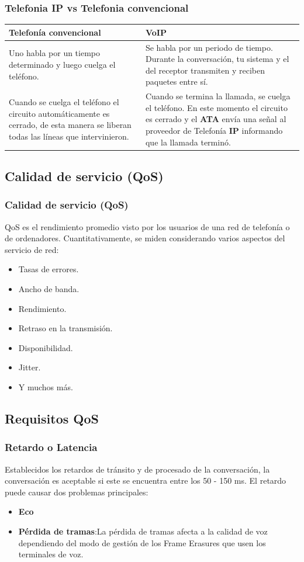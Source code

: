 \documentclass{beamer}
\begin{document}
	\begin{frame}
	\frametitle{Telefonia IP vs Telefonia convencional}
		\begin{tabular}{|p{5.5cm}|p{5.5cm}|}
					\hline
			\textbf{Telefonía convencional} & \textbf{VoIP} \\
			\hline \hline
			Uno habla por un tiempo determinado y luego cuelga el teléfono. & Se habla por un periodo de tiempo. Durante la conversación, tu sistema y el del receptor transmiten y reciben paquetes entre sí. \\
			\hline
			Cuando se cuelga el teléfono el circuito automáticamente es cerrado, de esta manera se liberan todas las líneas que intervinieron. & Cuando se termina la llamada, se cuelga el teléfono. En este momento el circuito es cerrado y el \textbf{ATA} envía una señal al proveedor de Telefonía \textbf{IP} informando que la llamada terminó. \\
			\hline
		\end{tabular}
	\end{frame}
	
	\subsection{Calidad de servicio (QoS)}
	\begin{frame}
	\frametitle{Calidad de servicio (QoS)}
		QoS es el rendimiento promedio visto por los usuarios de una red de telefonía o de ordenadores. Cuantitativamente, se miden considerando varios aspectos del servicio de red:
		\begin{itemize}
			\item Tasas de errores.
			\item Ancho de banda.
			\item Rendimiento.
			\item Retraso en la transmisión.
			\item Disponibilidad.
			\item Jitter.
			\item Y muchos más.
		\end{itemize}
	\end{frame}
	
	\subsection{Requisitos QoS}
	\begin{frame}
	\frametitle{Retardo o Latencia}
		Establecidos los retardos de tránsito y de procesado de la conversación, la conversación es aceptable si este se encuentra entre los 50 - 150 ms. 
		El retardo puede causar dos problemas principales:
		\begin{itemize}
			\item \textbf{Eco}
			\item \textbf{Pérdida de tramas}:La pérdida de tramas afecta a la calidad de voz dependiendo del modo de gestión de los Frame Erasures que usen los terminales de voz.
		\end{itemize}
	\end{frame}
	
\end{document}
